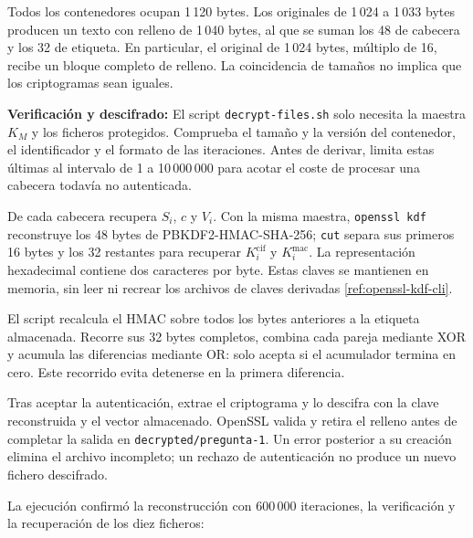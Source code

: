 Todos los contenedores ocupan 1\,120 bytes. Los originales de 1\,024 a 1\,033 bytes producen un texto con relleno de 1\,040 bytes, al que se suman los 48 de cabecera y los 32 de etiqueta.
En particular, el original de 1\,024 bytes, múltiplo de 16, recibe un bloque completo de relleno. La coincidencia de tamaños no implica que los criptogramas sean iguales.

\textbf{Verificación y descifrado:} El script \texttt{decrypt-files.sh} solo necesita la maestra $K_M$ y los ficheros protegidos. Comprueba el tamaño y la versión del contenedor, el identificador y el formato de las iteraciones.
Antes de derivar, limita estas últimas al intervalo de 1 a 10\,000\,000 para acotar el coste de procesar una cabecera todavía no autenticada.

De cada cabecera recupera $S_i$, $c$ y $V_i$. Con la misma maestra, \texttt{openssl kdf} reconstruye los 48 bytes de PBKDF2-HMAC-SHA-256; \texttt{cut} separa sus primeros 16 bytes y los 32 restantes para recuperar $K_i^{\mathrm{cif}}$ y $K_i^{\mathrm{mac}}$.
La representación hexadecimal contiene dos caracteres por byte. Estas claves se mantienen en memoria, sin leer ni recrear los archivos de claves derivadas \ref{ref:openssl-kdf-cli}.

El script recalcula el HMAC sobre todos los bytes anteriores a la etiqueta almacenada. Recorre sus 32 bytes completos, combina cada pareja mediante XOR y acumula las diferencias mediante OR: solo acepta si el acumulador termina en cero.
Este recorrido evita detenerse en la primera diferencia.

Tras aceptar la autenticación, extrae el criptograma y lo descifra con la clave reconstruida y el vector almacenado. OpenSSL valida y retira el relleno antes de completar la salida en \texttt{decrypted/pregunta-1}.
Un error posterior a su creación elimina el archivo incompleto; un rechazo de autenticación no produce un nuevo fichero descifrado.

\begingroup
\renewcommand{\lstlistingname}{Script}

\endgroup

La ejecución confirmó la reconstrucción con 600\,000 iteraciones, la verificación y la recuperación de los diez ficheros:

\noindent\begin{minipage}{\linewidth}
\begingroup
\renewcommand{\lstlistingname}{Salida y verificación}

\endgroup
\end{minipage}

